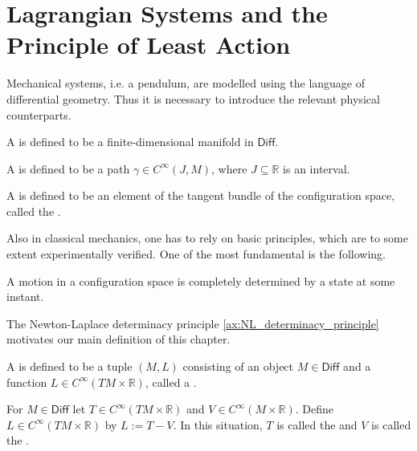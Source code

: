 \section*{Lagrangian Systems and the Principle of Least Action}
Mechanical systems, i.e. a pendulum, are modelled using the language of differential geometry. Thus it is necessary to introduce the relevant physical counterparts. 

\begin{definition}
	A  is defined to be a finite-dimensional manifold in $\mathsf{Diff}$.
\end{definition}

\begin{definition}[Motion]
	A  is defined to be a path $\gamma \in C^\infty(J, M)$, where $J \subseteq \mathbb{R}$ is an interval.
\end{definition}

\begin{definition}[State]
	A  is defined to be an element of the tangent bundle of the configuration space, called the .
\end{definition}

Also in classical mechanics, one has to rely on basic principles, which are to some extent experimentally verified. One of the most fundamental is the following.

\begin{axiom}
	\label{ax:NL_determinacy_principle}
	A motion in a configuration space is completely determined by a state at some instant.
\end{axiom}

The Newton-Laplace determinacy principle \ref{ax:NL_determinacy_principle} motivates our main definition of this chapter.

\begin{definition}
	A  is defined to be a tuple $(M,L)$ consisting of an object $M \in \mathsf{Diff}$ and a function $L \in C^\infty(TM \times \mathbb{R})$, called a .
\end{definition}

\begin{example}
	\label{ex:Lagrangian}
	For $M \in \mathsf{Diff}$ let $T \in C^\infty(TM \times \mathbb{R})$ and $V \in C^\infty(M \times \mathbb{R})$. Define $L \in C^\infty(TM \times \mathbb{R})$ by $L := T - V$. In this situation, $T$ is called the  and $V$ is called the .
\end{example}

